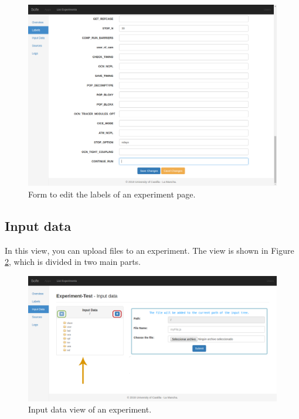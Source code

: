 \documentclass[11pt]{article}
\begin{document}
\begin{figure}[htp]
	\centering
	\includegraphics[width=\linewidth]{img/labels-edit}
	\caption{Form to edit the labels of an experiment page.}
	\label{fig:labels-edit}
\end{figure}

\subsection{Input data}\label{sec:inputData}
In this view, you can upload files to an experiment. The view is shown in Figure \ref{fig:input-data}, which is divided in two main parts.\\
\begin{figure}[htp]
	\centering
	\includegraphics[width=\linewidth]{img/input-data}
	\caption{Input data view of an experiment.}
	\label{fig:input-data}
\end{figure}
\end{document}
